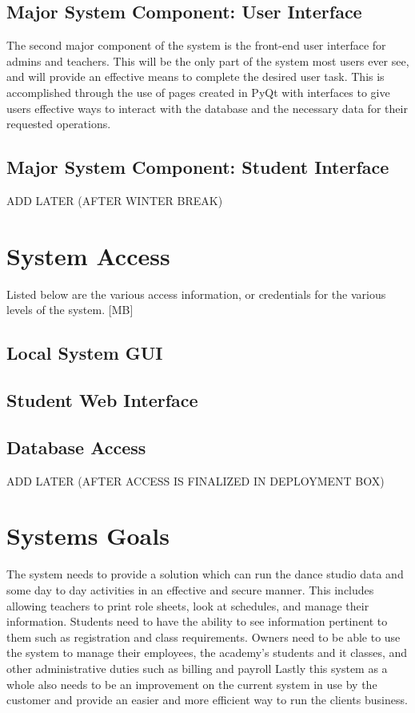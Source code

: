 \subsection{Major System Component: User Interface}
The second major component of the system is the front-end user interface for admins and teachers. This will be the only part of the system most users ever see, and will provide an effective means to complete the desired user task. This is accomplished through the use of pages created in PyQt with interfaces to give users effective ways to interact with the database and the necessary data for their requested operations.

\subsection{Major System Component: Student Interface}
ADD LATER (AFTER WINTER BREAK)

\section{System Access}
Listed below are the various access information, or credentials for the various levels of the system. [MB]

\subsection{Local System GUI}
\subsection{Student Web Interface}
\subsection{Database Access}
ADD LATER (AFTER ACCESS IS FINALIZED IN DEPLOYMENT BOX)

\section{Systems Goals}
The system needs to provide a solution which can run the dance studio data and some day to day activities in an effective and secure manner. This includes allowing teachers to print role sheets, look at schedules, and manage their information. Students need to have the ability to see information pertinent to them such as registration and class requirements. Owners need to be able to use the system to manage their employees, the academy's students and it classes, and other administrative duties such as billing and payroll  Lastly this system as a whole also needs to be an improvement on the current system in use by the customer and provide an easier and more efficient way to run the clients business.

